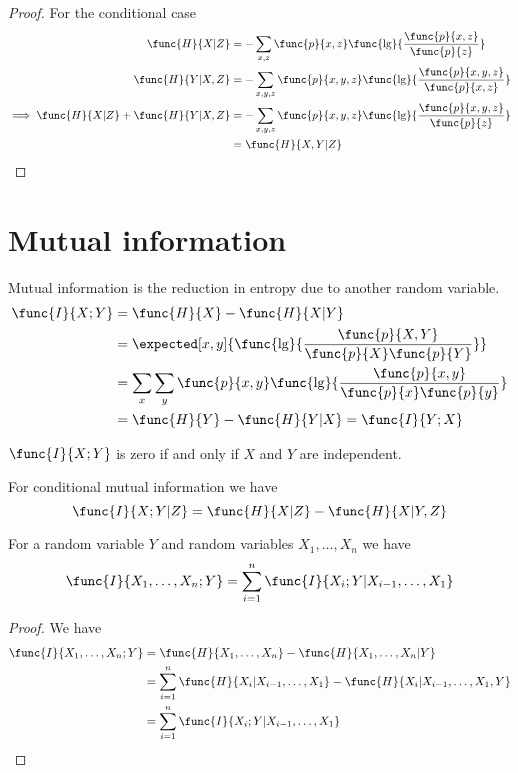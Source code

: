 \begin{proof}
      For the conditional case 
      \begin{align*}
            \func{H}{X|Z} &= - \sum_{x,z} \func{p}{x,z} \func{\lg}{\dfrac{\func{p}{x,z}}{\func{p}{z}}}\\
            \func{H}{Y|X,Z} &= - \sum_{x,y,z} \func{p}{x,y,z} \func{\lg}{\dfrac{\func{p}{x,y,z}}{\func{p}{x,z}}}\\
            \implies  \func{H}{X|Z} +  \func{H}{Y|X,Z} &= -\sum_{x,y,z} \func{p}{x,y,z} \func{\lg}{\dfrac{\func{p}{x,y,z}}{\func{p}{z}}}\\
            &= \func{H}{X,Y|Z}
      \end{align*}
\end{proof}

\section{Mutual information}
Mutual information is the reduction in entropy due to another random variable. 
\begin{align*}
      \func{I}{X;Y} &= \func{H}{X} - \func{H}{X|Y} \\
      &= \expected[x,y]{\func{\lg}{\dfrac{\func{p}{X,Y}}{\func{p}{X} \func{p}{Y}}}}\\
      &= \sum_{x} \sum_y \func{p}{x,y} \func{\lg}{\dfrac{\func{p}{x,y}}{\func{p}{x} \func{p}{y}}}\\
      &= \func{H}{Y} - \func{H}{Y|X} = \func{I}{Y;X}
\end{align*}

\begin{proposition}
      \(\func{I}{X;Y}\) is zero if and only if \(X\) and \(Y\) are independent.
\end{proposition}
For conditional mutual information we have 
\begin{equation*}
      \func{I}{X;Y | Z} = \func{H}{X|Z} - \func{H}{X|Y,Z}
\end{equation*}

\begin{proposition}
      For a random variable \(Y\) and random variables \(X_1, \dots , X_n\) we have 
      \begin{equation*}
            \func{I}{X_1, \dots , X_n ; Y} = \sum_{i = 1}^n \func{I}{X_i;Y | X_{i-1} , \dots , X_1}
      \end{equation*}
\end{proposition}
\begin{proof}
      We have 
      \begin{align*}
            \func{I}{X_1, \dots ,X_n ; Y} &= \func{H}{X_1, \dots, X_n} - \func{H}{X_1, \dots , X_n | Y}\\
            &= \sum_{i = 1}^n \func{H}{X_i | X_{i-1} , \dots , X_1} - \func{H}{X_i | X_{i - 1} , \dots , X_1, Y}\\
            &= \sum_{i=1}^n \func{I}{X_i ; Y | X_{i-1}, \dots , X_1}
      \end{align*}
\end{proof}

